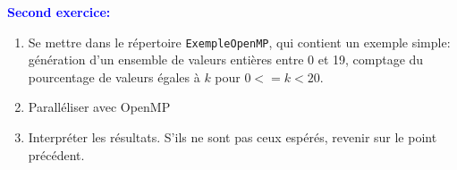 \documentclass{beamer}
\begin{document}
\begin{frame}
	\textcolor{blue}{\bf Second exercice:}
        \vfill
	\begin{enumerate}
		\item Se mettre dans le r\'epertoire {\tt ExempleOpenMP}, qui contient un exemple simple: g\'en\'eration d'un ensemble de valeurs enti\`eres entre 0 et 19,
			comptage du pourcentage de valeurs \'egales \`a $k$ pour $0<=k<20$.
	        \item Parall\'eliser avec OpenMP
		\item Interpr\'eter les r\'esultats. S'ils ne sont pas ceux esp\'er\'es, revenir sur le point pr\'ec\'edent.
	\end{enumerate}
	\vfill
	\vfill
\end{frame}
\end{document}

